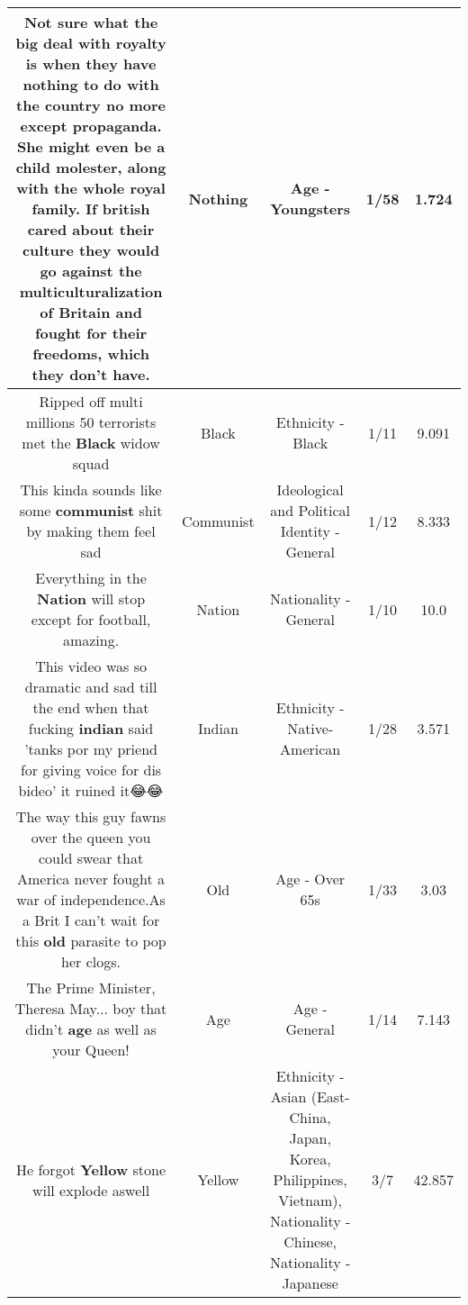 \documentclass[11pt]{article}
\newlength\mylength
\begin{document}
\begin{center}
\begin{longtable}{|C{.65\mylength}|C{.30\mylength}|C{.12\mylength}|C{.12\mylength}|C{.12\mylength}|}
  \small Not sure what the big deal with royalty is when they have \textbf{nothing} to do with the country no more except propaganda. She might even be a child molester, along with the whole royal family. If british cared about their culture they would go against the multiculturalization of Britain and fought for their freedoms, which they don't have.\normalsize   & Nothing & Age - Youngsters & 1/58 & 1.724 \\  \hline
  \small Ripped off multi millions 50 terrorists met the \textbf{Black} widow squad\normalsize   & Black & Ethnicity - Black & 1/11 & 9.091 \\  \hline
  \small This kinda sounds like some \textbf{communist} shit by making them feel sad\normalsize   & Communist &  Ideological and Political Identity - General & 1/12 & 8.333 \\  \hline
  \small Everything in the \textbf{Nation} will stop except for football, amazing.\normalsize   & Nation & Nationality - General & 1/10 & 10.0 \\  \hline
  \small This video was so dramatic and sad till the end when that fucking \textbf{indian} said 'tanks por my priend for giving voice for dis bideo' it ruined it😂😂\normalsize   & Indian & Ethnicity - Native-American & 1/28 & 3.571 \\  \hline
  \small The way this guy fawns over the queen you could swear that America never fought a war of independence.As a Brit I can't wait for this \textbf{old} parasite to pop her clogs.\normalsize   & Old & Age - Over 65s & 1/33 & 3.03 \\  \hline
  \small The Prime Minister, Theresa May... boy that didn't \textbf{age} as well as your Queen!\normalsize   & Age & Age - General & 1/14 & 7.143 \\  \hline
  \small He forgot \textbf{Y\textbf{e\textbf{llow}}} stone will explode aswell\normalsize   & Yellow & Ethnicity - Asian (East- China, Japan, Korea, Philippines, Vietnam), Nationality - Chinese, Nationality - Japanese & 3/7 & 42.857 \\  \hline

\end{longtable}
\end{center}
\end{document}
